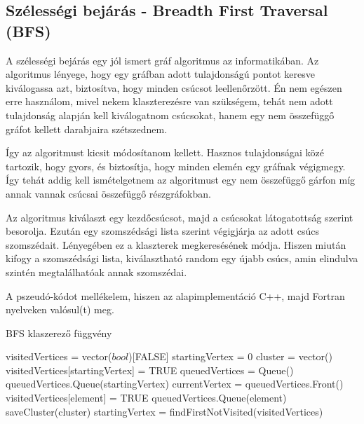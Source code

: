 \documentclass[a4paper,12pt]{article}
\begin{document}
\subsection{ Szélességi bejárás - Breadth First Traversal (BFS)}

\par A szélességi bejárás egy jól ismert gráf algoritmus az informatikában. Az algoritmus lényege, hogy egy gráfban adott tulajdonságú pontot keresve kiválogassa azt, biztosítva, hogy minden csúcsot leellenőrzött. Én nem egészen erre használom, mivel nekem klaszterezésre van szükségem, tehát nem adott tulajdonság alapján kell kiválogatnom csúcsokat, hanem egy nem összefüggő gráfot kellett darabjaira szétszednem.

\vspace{2mm}

\par Így az algoritmust kicsit módosítanom kellett. Hasznos tulajdonságai közé tartozik, hogy gyors, és biztosítja, hogy minden elemén egy gráfnak végigmegy. Így tehát addig kell ismételgetnem az algoritmust egy nem összefüggő gárfon míg annak vannak csúcsai összefüggő részgráfokban. 

\vspace{2mm}

\par Az algoritmus kiválaszt egy kezdőcsúcsot, majd a csúcsokat látogatottság szerint besorolja. Ezután egy szomszédsági lista szerint végigjárja az adott csúcs szomszédait. Lényegében ez a klaszterek megkeresésének módja. Hiszen miután kifogy a szomszédsági lista, kiválasztható random egy újabb csúcs, amin elindulva szintén megtalálhatóak annak szomszédai. 

\vspace{2mm}

\par A pszeudó-kódot mellékelem, hiszen az alapimplementáció C++, majd Fortran nyelveken valósul(t) meg.

\begin{center}
\begin{algorithm}
\caption{BFS klaszerező függvény}
\begin{algorithmic}
\STATE visitedVertices = vector($bool$)[FALSE]
\STATE startingVertex = 0
	\STATE cluster = vector()
	\STATE visitedVertices[startingVertex] = TRUE
	\STATE queuedVertices = Queue()
	\STATE queuedVertices.Queue(startingVertex)
		\STATE currentVertex = queuedVertices.Front()
				\STATE visitedVertices[element] = TRUE
				\STATE queuedVertices.Queue(element)
			\ENDIF
		\ENDFOR
	\STATE saveCluster(cluster)
	\STATE startingVertex = findFirstNotVisited(visitedVertices)
	\ENDWHILE
\ENDWHILE
\end{algorithmic}
\end{algorithm}
\end{center}
\end{document}
